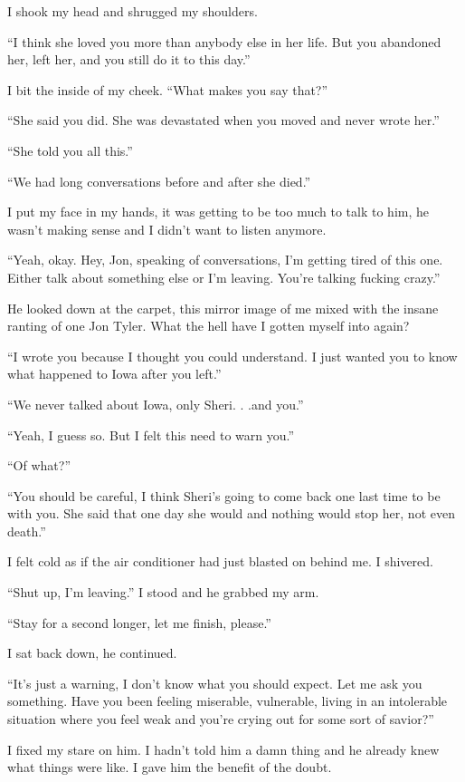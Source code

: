 I shook my head and shrugged my shoulders.

``I think she loved you more than anybody else in her life. But you
abandoned her, left her, and you still do it to this day.''

I bit the inside of my cheek. ``What makes you say that?''

``She said you did. She was devastated when you moved and never wrote
her.''

``She told you all this.''

``We had long conversations before and after she died.''

I put my face in my hands, it was getting to be too much to talk to him,
he wasn't making sense and I didn't want to listen anymore.

``Yeah, okay. Hey, Jon, speaking of conversations, I'm getting tired of
this one. Either talk about something else or I'm leaving. You're
talking fucking crazy.''

He looked down at the carpet, this mirror image of me mixed with the
insane ranting of one Jon Tyler. What the hell have I gotten myself into
again?

``I wrote you because I thought you could understand. I just wanted you
to know what happened to Iowa after you left.''

``We never talked about Iowa, only Sheri. . .and you.''

``Yeah, I guess so. But I felt this need to warn you.''

``Of what?''

``You should be careful, I think Sheri's going to come back one last
time to be with you. She said that one day she would and nothing would
stop her, not even death.''

I felt cold as if the air conditioner had just blasted on behind me. I
shivered.

``Shut up, I'm leaving.'' I stood and he grabbed my arm.

``Stay for a second longer, let me finish, please.''

I sat back down, he continued.

``It's just a warning, I don't know what you should expect. Let me ask
you something. Have you been feeling miserable, vulnerable, living in an
intolerable situation where you feel weak and you're crying out for some
sort of savior?''

I fixed my stare on him. I hadn't told him a damn thing and he already
knew what things were like. I gave him the benefit of the doubt.

